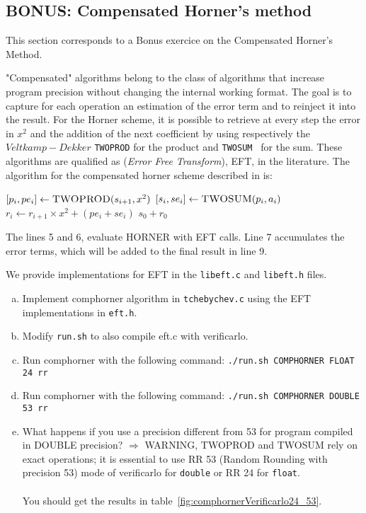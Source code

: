 \subsection{BONUS: Compensated Horner's method}
This section corresponds to a Bonus exercice on the Compensated Horner's Method.

"Compensated" algorithms belong to the class of algorithms that increase
program precision without changing the internal working format.
The goal is to capture for each operation an estimation of the error term and to reinject it into the result.
For the Horner scheme, it is possible to retrieve at every step the error in
$x^2$ and the addition of the next coefficient by using respectively the
$Veltkamp-Dekker$ {\tt TWOPROD} for the product and { \tt TWOSUM } for the sum.
These algorithms are qualified as ({\it Error Free Transform}), EFT, in the
literature.
The algorithm for the compensated horner scheme described in \cite{graillat2005compensated} is:

\begin{algorithmic}[1]
       \State $[p_i, pe_i] \gets \text{\sc TWOPROD}(s_{i+1}, x^2)$
       \State $[s_i, se_i] \gets \text{\sc TWOSUM}(p_i, a_i)$
       \State $r_i \gets r_{i+1}\times x^2+(pe_i+se_i)$
    \EndFor
    \State \Return $s_0 + r_0$
  \EndProcedure
\end{algorithmic}

The lines 5 and 6, evaluate HORNER with EFT calls. Line 7 accumulates the error terms, which will be added to the final result in line 9.

We provide implementations for EFT in the {\tt libeft.c} and {\tt libeft.h} files.

\begin{question}
  \begin{enumerate}[(a)]
    \item Implement comphorner algorithm in {\tt tchebychev.c} using the EFT implementations in {\tt eft.h}.
    \item Modify {\tt run.sh} to also compile eft.c with verificarlo.
    \item Run comphorner with the following command: {\tt ./run.sh COMPHORNER FLOAT 24 rr}
    \item Run comphorner with the following command: {\tt ./run.sh COMPHORNER DOUBLE 53 rr}
    \item What happens if you use a precision different from 53 for program compiled in DOUBLE precision?
      $\Rightarrow$ WARNING, {\sc TWOPROD} and {\sc TWOSUM} rely on exact operations; it is essential to use RR 53 (Random Rounding with precision 53) mode of verificarlo for  \texttt{double} or RR 24 for \texttt{float}.
      \\~\\
      You should get the results in table~\ref{fig:comphornerVerificarlo24_53}.

  \end{enumerate}
\end{question}


